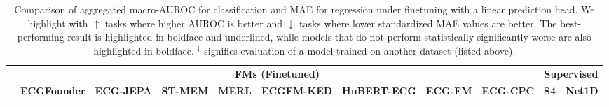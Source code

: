 \documentclass{article}
\begin{document}
            \begin{table}[t]
                \centering
                \tiny
                \setlength{\tabcolsep}{2pt}
                \caption{Comparison of aggregated macro-AUROC for classification and MAE for regression under finetuning with a linear prediction head. We highlight with $\uparrow$ tasks where higher AUROC is better and $\downarrow$ tasks where lower standardized MAE values are better. The best-performing result is highlighted in boldface and underlined, while models that do not perform statistically significantly worse are also highlighted in boldface. ${}^\dagger$ signifies evaluation of a model trained on another dataset (listed above).}
                \label{tab:finetuning_result}
                \begin{tabular}{lcccccccccc}
                    \toprule
                    & \multicolumn{8}{c}{\textbf{FMs (Finetuned)}} &\multicolumn{2}{c}{\textbf{Supervised}} \\
                    \cmidrule(l){2-9}\cmidrule(l){10-11}
                     & \textbf{ECGFounder} & \textbf{ECG-JEPA} & \textbf{ST-MEM} & \textbf{MERL} & \textbf{ECGFM-KED} & \textbf{HuBERT-ECG} & \textbf{ECG-FM} & \textbf{ECG-CPC} &  \textbf{S4} & \textbf{Net1D} \\
                    \midrule
                    

\end{tabular}
\end{table}
\end{document}
